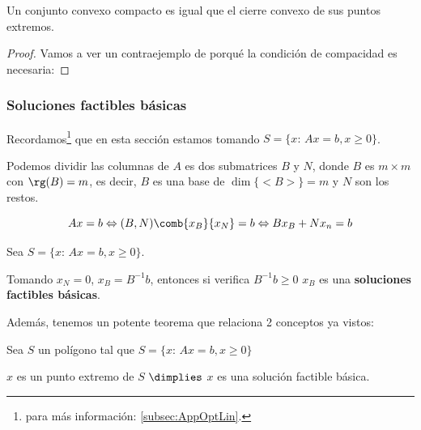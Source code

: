 \begin{prop}
Un conjunto convexo compacto es igual que el cierre convexo de sus puntos extremos.
\end{prop}

\begin{proof}
Vamos a ver un contraejemplo de porqué la condición de compacidad es necesaria:


%
%
\end{proof}

\begin{figure}[h]
\centering
{}
\end{figure}



\subsubsection{Soluciones factibles básicas}
Recordamos\footnote{ para más información: \ref{subsec:AppOptLin}.} que en esta sección estamos tomando $S=\{x:\, Ax=b, x\geq 0\}$. 

Podemos dividir las columnas de $A$ es dos submatrices $B$ y $N$, donde $B$ es $m\times m$ con $\rg(B)=m$, es decir, $B$ es una base de $\dim\{<B>\} = m$ y $N$ son los restos.


\[
Ax=b \Leftrightarrow (B,N) {\comb{x_B}{x_N}}=b \Leftrightarrow B x_B + Nx_n = b
\]

\label{def:SFB}
\begin{defn}
Sea $S=\{x:\, Ax=b, x\geq 0\}$. 

Tomando $x_N=0$, $x_B=B^{-1}b$, entonces si verifica $B^{-1}b\geq 0$ $x_B$ es una \textbf{soluciones factibles básicas}.
\end{defn}


Además, tenemos un potente teorema que relaciona 2 conceptos ya vistos:


\begin{theorem}
Sea $S$ un polígono tal que $S=\{x:\, Ax=b, x\geq 0\}$

$x$ es un punto extremo de $S$ $\dimplies$ $x$ es una solución factible básica.
\end{theorem}

